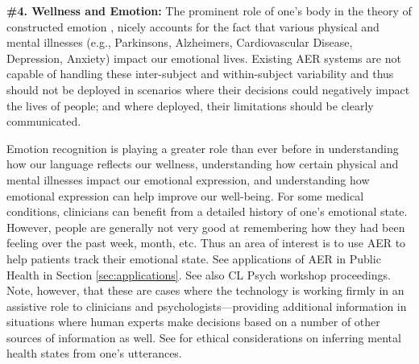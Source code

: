 \documentclass{clv3}
\begin{document}
\noindent \textbf{\#4. Wellness and Emotion:} The prominent role of one’s body in the theory of constructed emotion \cite{barrett2017emotions}, nicely accounts for the fact that various physical and mental illnesses (e.g., Parkinsons, Alzheimers, Cardiovascular Disease, Depression, Anxiety) impact our emotional lives. Existing AER systems are not capable of handling these inter-subject and within-subject variability and thus should not be deployed in scenarios where their decisions could negatively impact the lives of people; and where deployed, their limitations should be clearly communicated.

Emotion recognition is playing a greater role than ever before in understanding how our language reflects our wellness, 
understanding how certain physical and mental illnesses impact our emotional expression, and
understanding how emotional expression can help improve our well-being.
For some medical conditions, clinicians can benefit from a detailed history of one's emotional state. 
However, people are generally not very good at remembering how they had been feeling over the past week, month, etc.
Thus an area of interest is to use AER to help patients track their emotional state.
See applications of AER in Public Health in Section \ref{sec:applications}. See also CL Psych workshop proceedings. %
Note, however, that these are cases where the technology is working firmly in an assistive role to clinicians and psychologists---providing additional information in situations where human experts make decisions based on a number of other sources of information as well. See \citet{10.1145/3287560.3287587} for ethical considerations on inferring mental health states from one’s utterances.\\
\end{document}
